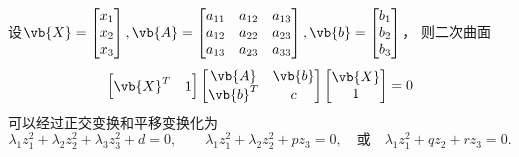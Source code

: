 \begin{theorem}[空间二次曲面的分类定理]
设\(\vb{X} = \begin{bmatrix}
	x_1 \\ x_2 \\ x_3
\end{bmatrix},
\vb{A} = \begin{bmatrix}
	a_{11} & a_{12} & a_{13} \\
	a_{12} & a_{22} & a_{23} \\
	a_{13} & a_{23} & a_{33}
\end{bmatrix},
\vb{b} = \begin{bmatrix}
	b_1 \\ b_2 \\ b_3
\end{bmatrix}\)，
则二次曲面\[
	\begin{bmatrix}
		\vb{X}^T & 1
	\end{bmatrix}
	\begin{bmatrix}
		\vb{A} & \vb{b} \\
		\vb{b}^T & c
	\end{bmatrix}
	\begin{bmatrix}
		\vb{X} \\ 1
	\end{bmatrix}
	= 0
\]可以经过正交变换和平移变换化为\[
	\lambda_1 z_1^2 + \lambda_2 z_2^2 + \lambda_3 z_3^2 + d = 0,
	\qquad
	\lambda_1 z_1^2 + \lambda_2 z_2^2 + p z_3 = 0,
	\quad\text{或}\quad
	\lambda_1 z_1^2 + q z_2 + r z_3 = 0.
\]
\end{theorem}

